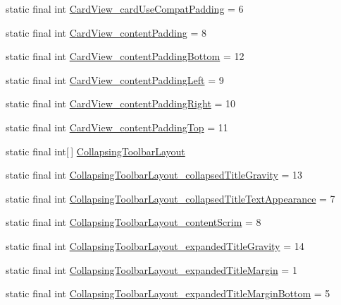 \begin{CompactItemize}
static final int \hyperlink{classandroid_1_1support_1_1v4_1_1_r_1_1styleable_5fa6aadc3bb0cfa41fd1cf7e91655290}{CardView\_\-cardUseCompatPadding} = 6
\item 
static final int \hyperlink{classandroid_1_1support_1_1v4_1_1_r_1_1styleable_5c42c3e1c3a5864233a443fd167fc4e3}{CardView\_\-contentPadding} = 8
\item 
static final int \hyperlink{classandroid_1_1support_1_1v4_1_1_r_1_1styleable_a790a1e2e5bcbfb64d641cb1be13698d}{CardView\_\-contentPaddingBottom} = 12
\item 
static final int \hyperlink{classandroid_1_1support_1_1v4_1_1_r_1_1styleable_aa20756d855da0a9dc2951095592f94f}{CardView\_\-contentPaddingLeft} = 9
\item 
static final int \hyperlink{classandroid_1_1support_1_1v4_1_1_r_1_1styleable_4b71c60ba2365d3191e754c31a6013a6}{CardView\_\-contentPaddingRight} = 10
\item 
static final int \hyperlink{classandroid_1_1support_1_1v4_1_1_r_1_1styleable_4a2edd3e314f6cd115aba1e91f596d81}{CardView\_\-contentPaddingTop} = 11
\item 
static final int\mbox{[}$\,$\mbox{]} \hyperlink{classandroid_1_1support_1_1v4_1_1_r_1_1styleable_aa101903fcf4b45a3b7fee0a0abc5ea8}{CollapsingToolbarLayout}
\item 
static final int \hyperlink{classandroid_1_1support_1_1v4_1_1_r_1_1styleable_759294fa22d1c3489a65fb1670048ebd}{CollapsingToolbarLayout\_\-collapsedTitleGravity} = 13
\item 
static final int \hyperlink{classandroid_1_1support_1_1v4_1_1_r_1_1styleable_36b5814dff9ad7add6371c9f816f66f0}{CollapsingToolbarLayout\_\-collapsedTitleTextAppearance} = 7
\item 
static final int \hyperlink{classandroid_1_1support_1_1v4_1_1_r_1_1styleable_060f29f1813e3c34f37be84c9cad4fcd}{CollapsingToolbarLayout\_\-contentScrim} = 8
\item 
static final int \hyperlink{classandroid_1_1support_1_1v4_1_1_r_1_1styleable_93665cc12bb385c8014cbdcaa5d898a6}{CollapsingToolbarLayout\_\-expandedTitleGravity} = 14
\item 
static final int \hyperlink{classandroid_1_1support_1_1v4_1_1_r_1_1styleable_d2288d088bf1c64e433d0cbecf59b50e}{CollapsingToolbarLayout\_\-expandedTitleMargin} = 1
\item 
static final int \hyperlink{classandroid_1_1support_1_1v4_1_1_r_1_1styleable_3c19128c4f13cc0876d4f6a58f4e2d88}{CollapsingToolbarLayout\_\-expandedTitleMarginBottom} = 5
\item 

\end{CompactItemize}
